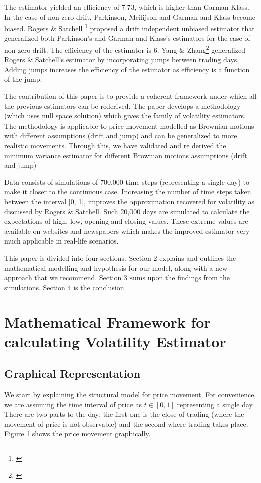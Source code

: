 \documentclass[12pt]{article}   	%
\begin{document}
The estimator yielded an efficiency of 7.73, which is higher than Garman-Klass. 
In the case of non-zero drift, Parkinson, Meilijson and Garman and Klass become biased.
Rogers \& Satchell \footnote{\citealp{rogers1991}} proposed a drift independent unbiased estimator that generalized both Parkinson's and Garman and Klass's estimators for the case of non-zero drift. The efficiency of the estimator is 6.
Yang \& Zhang\footnote{\citealp{yang2000}} generalized Rogers \& Satchell's estimator by incorporating jumps between trading days. Adding jumps increases the efficiency of the estimator as efficiency is a function of the jump.
\par The contribution of this paper is to provide a coherent framework under which all the previous estimators can be rederived. The paper develops a methodology (which uses null space solution) which gives the family of volatility estimators. The methodology is applicable to price movement modelled as Brownian motions with different assumptions (drift and jump) and can be generalized to more realistic movements. Through this, we have validated and re derived the minimum variance estimator for different Brownian motions assumptions (drift and jump)

\par Data consists of simulations of 700,000 time steps (representing a single day) to make it closer to the continuous case. Increasing the number of time steps taken between the interval [0, 1],  improves the approximation recovered for volatility as discussed by Rogers \& Satchell. Such 20,000 days are simulated to calculate the expectations of high, low, opening and closing values. These extreme values are available on websites and newspapers which makes the improved estimator very much applicable in real-life scenarios.
\par This paper is divided into four sections. Section 2 explains and outlines the mathematical modelling and hypothesis for our model, along with a new approach that we recommend. Section 3 sums upon the findings from the simulations. Section 4 is the conclusion. \\

\section{Mathematical Framework for calculating Volatility Estimator}
\subsection{Graphical Representation}
We start by explaining the structural model for price movement. For convenience, we are assuming the time interval of price as $t \in [0,1]$ representing a single day. There are two parts to the day; the first one is the close of trading (where the movement of price is not observable) and the second where trading takes place. Figure 1 shows the price movement graphically.
 
\end{document}
